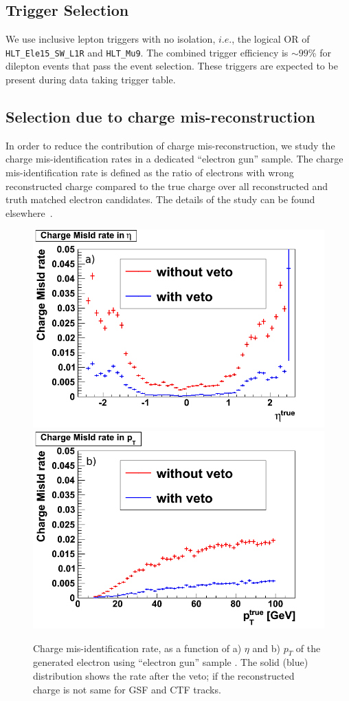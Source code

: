 \subsection{Trigger Selection}
\label{sec:trigger}
We use inclusive lepton triggers with no isolation, $i.e.$, the logical OR of {\tt HLT\_Ele15\_SW\_L1R} and {\tt HLT\_Mu9}.  
The combined trigger efficiency is $\sim 99$\% for dilepton events that pass the event selection.
These triggers are 
expected to be present during data taking trigger table.

\subsection{Selection due to charge mis-reconstruction}

In order to reduce the contribution of charge mis-reconstruction, we study the 
charge mis-identification rates in a dedicated ``electron gun'' sample. The charge 
mis-identification rate is defined as the ratio of electrons with wrong reconstructed
charge compared to the true charge over all reconstructed and truth matched electron
candidates. The details of the study can be found elsewhere~\cite{ctfgsf}.  
\vspace{3 mm}
\begin{figure}[htb]
\begin{center}
\includegraphics[width=0.485\linewidth,height=0.37\linewidth]{figs/ChargeMisIdRateEta.png}
\includegraphics[width=0.485\linewidth,height=0.37\linewidth]{figs/ChargeMisIdRatePt.png}
\caption{Charge mis-identification rate, as a function of a) $\eta$ and b) $p_T$ of the generated
electron using ``electron gun'' sample \label{fig:charge_misid}. The solid (blue) distribution shows
the rate after the veto; if the reconstructed charge is not same for GSF and CTF tracks.}
\end{center}
\end{figure}

